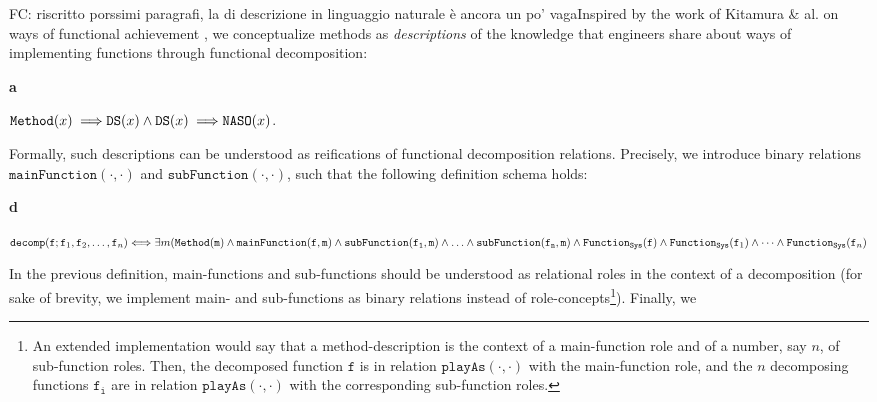 \documentclass[sw]{iosart2x}
\newcommand{\bflist}{\begin{list}{}{\setlength{\topsep}{2mm}\setlength{\partopsep}{0mm}\setlength{\parsep}{0mm}\setlength{\leftmargin}{9mm}\setlength{\labelwidth}{8mm}}}
\newcommand{\eflist}{\end{list}}
\newcommand{\AxLabel}{\textrm{a}}
\newcommand{\DefLabel}{\textrm{d}}
\newcounter{cntax}
\newcommand{\myax}[1]{\refstepcounter{cntax}\begin{small}{\bf \AxLabel\thecntax\label{ax:#1}}\end{small}}
\newcounter{cntdef}
\newcommand{\mydf}[1]{\refstepcounter{cntdef}\begin{small}{\bf \DefLabel\thecntdef\label{def:#1}}\end{small}}
\newcommand{\generalStyle}[1]{\texttt{#1}}
\newcommand{\biRel}[3]{\generalStyle{#1}(#2,#3)}
\newcommand{\uniRel}[2]{\generalStyle{#1}(#2)}
\newcommand{\uniRelPar}[3]{\generalStyle{#1}_{\generalStyle{#3}}(#2)}
\newcommand{\cst}[1]{\ensuremath{\mathtt{#1}}}
\newcommand{\myiff}{\Longleftrightarrow}
\newcommand{\myfi}{\hspace{0.9mm} \Longrightarrow}
\newcommand{\DOLCEDescription}[1]{\uniRel{{DS}}{#1}}
\newcommand{\DOLCENASO}[1]{\uniRel{{NASO}}{#1}}
\newcommand{\Method}[1]{\uniRel{Method}{#1}}
\newcommand{\FunctionSys}[1]{\uniRelPar{Function}{#1}{Sys}}
\newcommand{\mainFunction}[2]{\biRel{mainFunction}{#1}{#2}}
\newcommand{\subFunction}[2]{\biRel{subFunction}{#1}{#2}}
\newcommand{\playAs}[2]{\biRel{playAs}{#1}{#2}}
\newcommand{\decom}{\generalStyle{decomp}}
\newcommand{\firstTimeKeyWord}[1]{\textit{#1}}
\newcommand{\TODO}[1]{{\color{red} #1}}
\begin{document}
\TODO{FC: riscritto porssimi paragrafi, la di descrizione in linguaggio naturale è ancora un po' vaga}Inspired by the work of Kitamura \& al. on ways of functional achievement \cite{kitamuraOntologicalModelDevice2006, kitamuraOntologybasedDescriptionFunctional2003}, we conceptualize methods as \firstTimeKeyWord{descriptions}  of the knowledge that engineers share about ways of implementing functions through functional decomposition:
\bflist
  \item[\myax{methodSubs}] $ \Method{x} \myfi \DOLCEDescription{x} \land \DOLCEDescription{x}  \myfi \DOLCENASO{x}$.
\eflist
Formally, such descriptions can be understood as  reifications of functional decomposition relations.
Precisely, we introduce binary relations $\mainFunction{\cdot}{\cdot}$ and $\subFunction{\cdot}{\cdot}$, such that the following definition schema holds:
\bflist
  \item[\mydf{method}] $\decom(\cst{f};\cst{f}_1,\cst{f}_2,\dots,\cst{f}_n) \myiff \\ \exists m (\Method{\cst{m}} \land \mainFunction{\cst{f}}{\cst{m}} \land \subFunction{\cst{f_1}}{\cst{m}} \land \ldots \land \subFunction{\cst{f_n}}{\cst{m}} \land \FunctionSys{\cst{f}} \land \FunctionSys{\cst{f}_1} \land \dots \land \FunctionSys{\cst{f}_n}
 $
\eflist
In the previous definition, main-functions and sub-functions should be understood as relational roles in the context of a decomposition (for sake of brevity, we implement main- and sub-functions as binary relations instead of role-concepts\footnote{An extended implementation would say that a method-description is the context of a main-function role and of a number, say $n$, of sub-function roles. Then, the decomposed function $\cst{f}$ is in relation $\playAs{\cdot}{\cdot}$ with the main-function role, and the $n$ decomposing functions $\cst{f_i}$ are in relation $\playAs{\cdot}{\cdot}$ with the corresponding sub-function roles.}).
Finally, we 
\end{document}
